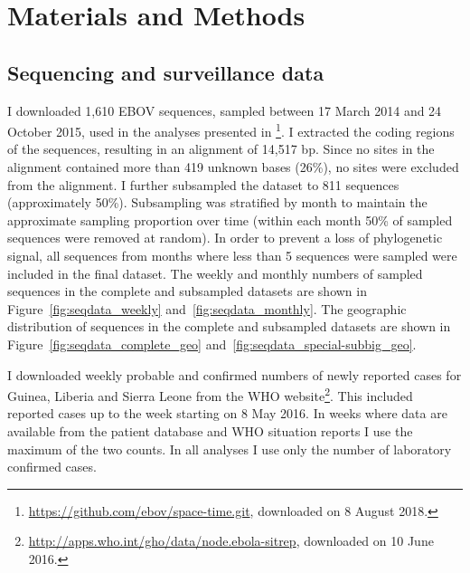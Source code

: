\section{Materials and Methods}

\subsection{Sequencing and surveillance data}

	I downloaded 1,610 EBOV sequences, sampled between 17 March 2014 and 24 October 2015, used in the analyses presented in \citet{Dudas2017Nature}\footnote{\url{https://github.com/ebov/space-time.git}, downloaded on 8 August 2018.}.
	I extracted the coding regions of the sequences, resulting in an alignment of 14,517 bp. Since no sites in the alignment contained more than 419 unknown bases (26\%), no sites were excluded from the alignment. 
	I further subsampled the dataset to 811 sequences (approximately 50\%). Subsampling was stratified by month to maintain the approximate sampling proportion over time (\ie within each month 50\% of sampled sequences were removed at random). In order to prevent a loss of phylogenetic signal, all sequences from months where less than 5 sequences were sampled were included in the final dataset. The weekly and monthly numbers of sampled sequences in the complete and subsampled datasets are shown in Figure~\ref{fig:seqdata_weekly} and~\ref{fig:seqdata_monthly}. The geographic distribution of sequences in the complete and subsampled datasets are shown in Figure~\ref{fig:seqdata_complete_geo} and~\ref{fig:seqdata_special-subbig_geo}.

	I downloaded weekly probable and confirmed numbers of newly reported cases for Guinea, Liberia and Sierra Leone from the WHO website\footnote{\url{http://apps.who.int/gho/data/node.ebola-sitrep}, downloaded on 10 June 2016.}. This included reported cases up to the week starting on 8 May 2016. 
	In weeks where data are available from the patient database and WHO situation reports I use the maximum of the two counts. 
	In all analyses I use only the number of laboratory confirmed cases.

